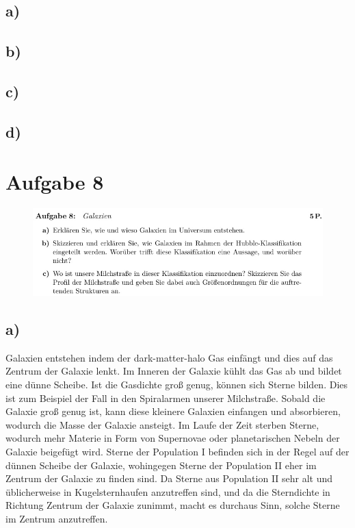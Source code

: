     \flushleft{\;}\justifying

\newpage
\subsection{a)}



\subsection{b)}



\subsection{c)}



\subsection{d)}



\section{Aufgabe 8}

\begin{figure}[H]
    \centering
    \includegraphics[width=\textwidth]{images/Aufgabe8.jpg}
    \label{fig:3}
\end{figure}

\newpage
\subsection{a)}

    \justifying Galaxien entstehen indem der dark-matter-halo Gas einfängt und dies auf das Zentrum der Galaxie lenkt. Im
    Inneren der Galaxie kühlt das Gas ab und bildet eine dünne Scheibe. Ist die Gasdichte groß genug, können sich Sterne bilden. Dies ist zum 
    Beispiel der Fall in den Spiralarmen unserer Milchstraße. Sobald die Galaxie groß genug ist, kann diese kleinere Galaxien einfangen und
    absorbieren, wodurch die Masse der Galaxie ansteigt. Im Laufe der Zeit sterben Sterne, wodurch mehr Materie in Form von Supernovae oder 
    planetarischen Nebeln der Galaxie beigefügt wird. Sterne der Population I befinden sich in der Regel auf der dünnen Scheibe der Galaxie, 
    wohingegen Sterne der Population II eher im Zentrum der Galaxie zu finden sind. Da Sterne aus Population II sehr alt und üblicherweise 
    in Kugelsternhaufen anzutreffen sind, und da die Sterndichte in Richtung Zentrum der Galaxie zunimmt, macht es durchaus Sinn, solche Sterne
    im Zentrum anzutreffen. 

